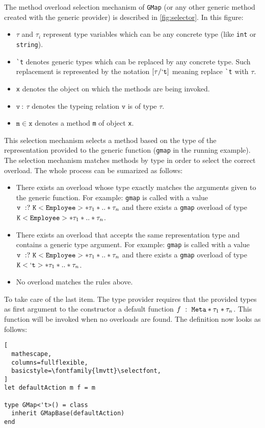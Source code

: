 \documentclass{sigplanconf}
\begin{document}
The method overload selection mechanism of \verb+GMap+ (or any other
generic method created with the generic provider) is described in
\ref{fig:selector}. In this figure:
\begin{itemize}
\item $\tau$ and $\tau_i$ represent type variables which can be any
  concrete type (like \verb+int+ or \verb+string+).
\item \verb+`t+ denotes generic types which can be replaced by any
  concrete type. Such replacement is represented by the notation
  $[\tau/\mathtt{`t}]$ meaning replace \verb=`t= with $\tau$.
\item \verb+x+ denotes the object on which the methods are being invoked.
\item $\mathtt{v}\ :\ \tau$ denotes the typeing relation $\mathtt{v}$ is of type $\tau$.
\item $\mathtt{m}\in\mathtt{x}$ denotes a method \verb+m+ of object \verb+x+.
\end{itemize}
This selection mechanism selects a method based on the type of the
representation provided to the generic function (\verb+gmap+ in the
running example). The selection mechanism matches methods by type in
order to select the correct overload. The whole process can be
sumarized as follows:
\begin{itemize}
\item There exists an overload whose type exactly matches the
  arguments given to the generic function. For example: \verb+gmap+ is
  called with a value $\mathtt{v}\ :?\
  \mathtt{K}<\mathtt{Employee}>*\tau_1*..*\tau_n$ and there exists a
  \verb+gmap+ overload of type
  $\mathtt{K}<\mathtt{Employee}>*\tau_1*..*\tau_n$.
\item There exists an overload that accepts the same representation
  type and contains a generic type argument. For example: \verb+gmap+
  is called with a value $\mathtt{v}\ :?\
  \mathtt{K}<\mathtt{Employee}>*\tau_1*..*\tau_n$ and there exists a
  \verb+gmap+ overload of type $\mathtt{K}<\mathtt{`t}>*\tau_1*..*\tau_n$.
\item No overload matches the rules above.
\end{itemize}
To take care of the last item. The type provider requires that the
provided types as first argument to the constructor a default function
$f\ :\ \mathtt{Meta}*\tau_1*\tau_n$. This function will be invoked when no
overloads are found. The definition now looks as follows:
\begin{lstlisting}[
  mathescape,
  columns=fullflexible,
  basicstyle=\fontfamily{lmvtt}\selectfont,
]
let defaultAction m f = m

type GMap<'t>() = class
  inherit GMapBase(defaultAction)
end
\end{lstlisting}
\end{document}
